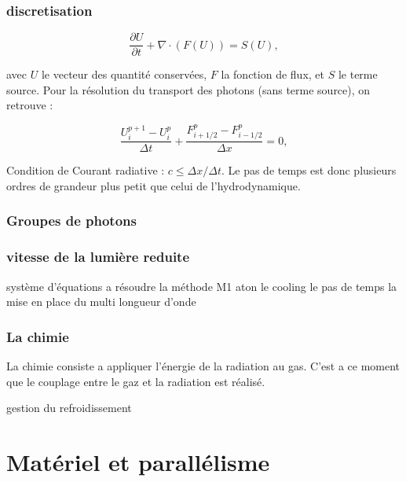 \subsection{discretisation}
\begin{equation}
 \frac{\partial U}{\partial t} + \nabla \cdot (F(U)) = S(U), 
\label{eq:rad_generale}
\end{equation}

avec $U$ le vecteur des quantité conservées, $F$ la fonction de flux, et $S$ le terme source. Pour la résolution du transport des photons (sans terme source), on retrouve :

\begin{equation}
\frac{ U^{p+1}_i - U^{p}_i }{\Delta t} + \frac{ F^{p}_{i
+1/2} - F^{p}_{i-1/2} }{\Delta x} =0,
\label{eq:rad_solver}
\end{equation}

Condition de Courant radiative : $ c \leq \Delta x / \Delta t $.
Le pas de temps est donc plusieurs ordres de grandeur plus petit que celui de l'hydrodynamique.

\subsection{Groupes de photons}
\label{sec:groupedephotons}


\subsection{vitesse de la lumière reduite}


système d'équations a résoudre
la méthode M1
aton
le cooling
le pas de temps
la mise en place du multi longueur d'onde

\subsection{La chimie}

La chimie consiste a appliquer l'énergie de la radiation au gas.
C'est a ce moment que le couplage entre le gaz et la radiation est réalisé.

gestion du refroidissement






\chapter{Matériel et parallélisme}


